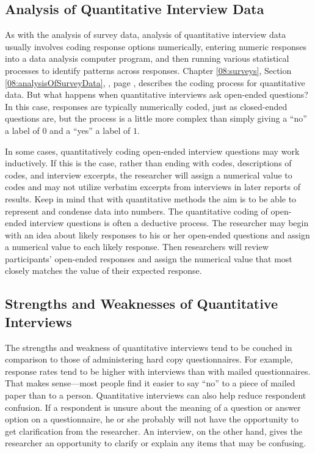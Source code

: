 \subsection{Analysis of Quantitative Interview Data}

As with the analysis of survey data, analysis of quantitative interview data usually involves coding response options numerically, entering numeric responses into a data analysis computer program, and then running various statistical processes to identify patterns across responses. Chapter \ref{08:surveys}, Section \ref{08:analysisOfSurveyData}, , page \pageref{08:analysisOfSurveyData}, describes the coding process for quantitative data. But what happens when quantitative interviews ask open-ended questions? In this case, responses are typically numerically coded, just as closed-ended questions are, but the process is a little more complex than simply giving a ``no'' a label of $ 0 $ and a ``yes'' a label of $ 1 $.

In some cases, quantitatively coding open-ended interview questions may work inductively. If this is the case, rather than ending with codes, descriptions of codes, and interview excerpts, the researcher will assign a numerical value to codes and may not utilize verbatim excerpts from interviews in later reports of results. Keep in mind that with quantitative methods the aim is to be able to represent and condense data into numbers. The quantitative coding of open-ended interview questions is often a deductive process. The researcher may begin with an idea about likely responses to his or her open-ended questions and assign a numerical value to each likely response. Then researchers will review participants' open-ended responses and assign the numerical value that most closely matches the value of their expected response.

\subsection{Strengths and Weaknesses of Quantitative Interviews}

The strengths and weakness of quantitative interviews tend to be couched in comparison to those of administering hard copy questionnaires. For example, response rates tend to be higher with interviews than with mailed questionnaires. That makes sense---most people find it easier to say ``no'' to a piece of mailed paper than to a person. Quantitative interviews can also help reduce respondent confusion. If a respondent is unsure about the meaning of a question or answer option on a questionnaire, he or she probably will not have the opportunity to get clarification from the researcher. An interview, on the other hand, gives the researcher an opportunity to clarify or explain any items that may be confusing.

